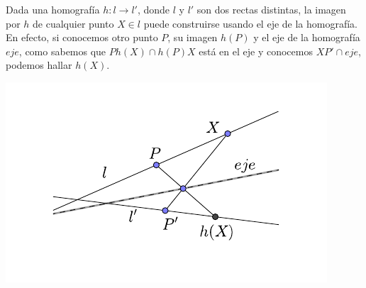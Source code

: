 \begin{obs}
	Dada una homografía $h:l\rightarrow l'$, donde $l$ y $l'$ son dos rectas distintas, la imagen por $h$ de cualquier punto $X\in l$ puede construirse usando el eje de la homografía. En efecto, si conocemos otro punto $P$, su imagen $h(P)$ y el eje de la homografía $eje$, como sabemos que $Ph(X)\cap h(P)X$ está en el eje y conocemos $XP'\cap eje$, podemos hallar $h(X)$.
	\begin{center}
		\includegraphics[scale=1]{Graficos/TeoremaDelEje/DeterminacionImagenHom}
	\end{center} 
\end{obs}
